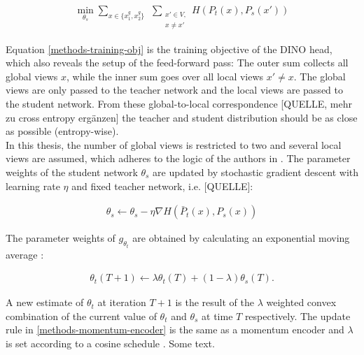 \begin{align}
	\min_{\theta_s}\sum_{x \in \{x_1^g, x_2^g\}} \hspace{5pt} \sum_{\substack{ x'\in V, \\ x\neq x'}} H(P_t(x),P_s(x'))
	\label{methods-training-obj}
\end{align}

Equation \ref{methods-training-obj} is the training objective of the DINO head, which also reveals the setup of the feed-forward pass:
The outer sum collects all global views $x$, while the inner sum goes over all local views $x'\neq x$.
The global views are only passed to the teacher network and the local views are passed to the student network.
From these global-to-local correspondence [QUELLE, mehr zu cross entropy ergänzen] the teacher and student distribution should be as close as possible (entropy-wise).
\\
In this thesis, the number of global views is restricted to two and several local views are assumed, which adheres to the logic of the authors in \citep{Caron2021}. 
The parameter weights of the student network $\theta_s$ are updated by stochastic gradient descent with learning rate $\eta$ and fixed teacher network, i.e. [QUELLE]:

\begin{align}
	\theta_s \leftarrow \theta_s - \eta \nabla H(\bar{P}_t(x),P_s(x))
\end{align}

The parameter weights of $g_{\theta_t}$ are obtained by calculating an exponential moving average \citep{Grill2020,Caron2021}: 

\begin{align}
	\theta_t(T+1) \leftarrow \lambda \theta_t(T) + (1-\lambda) \theta_s(T).
	\label{methods-momentum-encoder}
\end{align}

A new estimate of $\theta_t$ at iteration $T+1$ is the result of the $\lambda$ weighted convex combination of the current value of $\theta_t$ and $\theta_s$ at time $T$ respectively.
The update rule in \ref{methods-momentum-encoder} is the same as a momentum encoder \citep{He2019} and $\lambda$ is set according to a cosine schedule \citep{Grill2020}.
\newpage
{}
Some text.